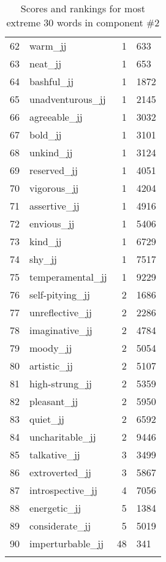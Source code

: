 \begin{longtable}[!htbp]{| rlr@{.}l |}
    62 & warm\_jj & 1 & 633 \\
    63 & neat\_jj & 1 & 653 \\
    64 & bashful\_jj & 1 & 1872 \\
    65 & unadventurous\_jj & 1 & 2145 \\
    66 & agreeable\_jj & 1 & 3032 \\
    67 & bold\_jj & 1 & 3101 \\
    68 & unkind\_jj & 1 & 3124 \\
    69 & reserved\_jj & 1 & 4051 \\
    70 & vigorous\_jj & 1 & 4204 \\
    71 & assertive\_jj & 1 & 4916 \\
    72 & envious\_jj & 1 & 5406 \\
    73 & kind\_jj & 1 & 6729 \\
    74 & shy\_jj & 1 & 7517 \\
    75 & temperamental\_jj & 1 & 9229 \\
    76 & self-pitying\_jj & 2 & 1686 \\
    77 & unreflective\_jj & 2 & 2286 \\
    78 & imaginative\_jj & 2 & 4784 \\
    79 & moody\_jj & 2 & 5054 \\
    80 & artistic\_jj & 2 & 5107 \\
    81 & high-strung\_jj & 2 & 5359 \\
    82 & pleasant\_jj & 2 & 5950 \\
    83 & quiet\_jj & 2 & 6592 \\
    84 & uncharitable\_jj & 2 & 9446 \\
    85 & talkative\_jj & 3 & 3499 \\
    86 & extroverted\_jj & 3 & 5867 \\
    87 & introspective\_jj & 4 & 7056 \\
    88 & energetic\_jj & 5 & 1384 \\
    89 & considerate\_jj & 5 & 5019 \\
    90 & imperturbable\_jj & 48 & 341 \\
    \hline
    \caption{Scores and rankings for most extreme 30 words in component \#2} \\
\end{longtable}
